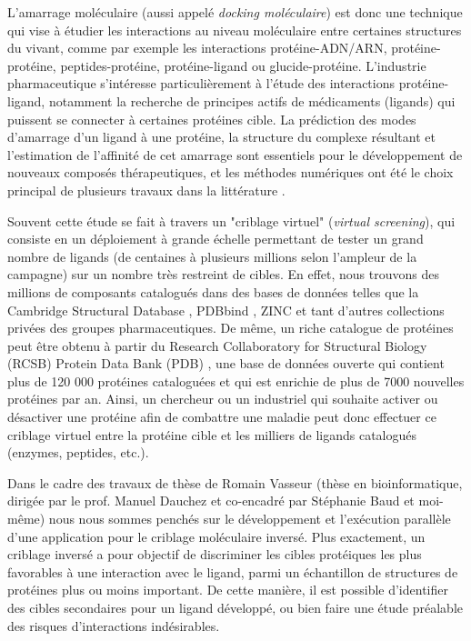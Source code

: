 L'amarrage moléculaire (aussi appelé \emph{docking moléculaire}) est donc une technique qui vise à étudier les interactions au niveau moléculaire entre certaines structures du vivant, comme par exemple les interactions protéine-ADN/ARN, protéine-protéine, peptides-protéine, protéine-ligand ou glucide-protéine. L'industrie pharmaceutique s'intéresse particulièrement à l'étude des interactions protéine-ligand, notamment la recherche de principes actifs de médicaments (ligands) qui puissent se connecter à certaines protéines cible. La prédiction des modes d'amarrage d'un ligand à une protéine, la structure du complexe résultant et l'estimation de l'affinité de cet amarrage sont essentiels pour le développement de nouveaux composés thérapeutiques, et les méthodes numériques ont été le choix principal de plusieurs travaux dans la littérature \cite{Abagyan2001,Giganti2010, Klebe2006}.

 Souvent cette étude se fait à travers un "criblage virtuel" (\emph{virtual screening}), qui consiste en un déploiement à grande échelle permettant de tester un grand nombre de ligands (de centaines à plusieurs millions selon l’ampleur de la campagne) sur un nombre très restreint de cibles. En effet, nous trouvons des millions de composants catalogués dans des bases de données telles que la Cambridge Structural Database \cite{Allen2002}, PDBbind  \cite{Wang2004, Wang2005}, ZINC \cite{Irwin2005} et tant d'autres collections privées des groupes pharmaceutiques. De même, un riche catalogue de protéines peut être obtenu à partir du Research Collaboratory for Structural Biology (RCSB) Protein Data Bank (PDB) \cite{PDB}, une base de données ouverte qui contient plus de 120 000 protéines cataloguées et qui est enrichie de plus de 7000 nouvelles protéines par an. Ainsi, un chercheur ou un industriel qui souhaite activer ou désactiver une protéine afin de combattre une maladie peut donc effectuer ce criblage virtuel entre la protéine cible et les milliers de ligands catalogués (enzymes, peptides, etc.).  

Dans le cadre des travaux de thèse de Romain Vasseur (thèse en bioinformatique, dirigée par le prof. Manuel Dauchez et co-encadré par Stéphanie Baud et moi-même) nous nous sommes penchés sur le développement et l'exécution parallèle d'une application pour le criblage moléculaire inversé. Plus exactement, un criblage inversé a pour objectif de discriminer les cibles protéiques les plus favorables à une interaction avec le ligand, parmi un échantillon de structures de protéines plus ou moins important. De cette manière, il est possible d'identifier des cibles secondaires pour un ligand développé, ou bien faire une étude préalable des risques d'interactions indésirables. 

